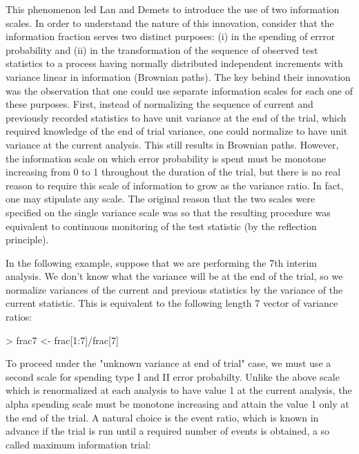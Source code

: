 \documentclass{article}
\begin{document}
\begin{itemize}
{    This phenomenon led Lan and Demets to introduce the use of two information scales.  In order
    to understand the nature of this innovation, consider that the information fraction serves
    two distinct purposes: (i) in the spending of errror probability and (ii) in the
    transformation of the sequence of observed test statistics to a process having normally
    distributed independent increments with variance linear in information (Brownian paths). The
    key behind their innovation was the observation that one could use separate information
    scales for each one of these purposes. First, instead of normalizing the sequence of current
    and previously recorded statistics to have unit variance at the end of the trial, which
    required knowledge of the end of trial variance, one could normalize to have unit variance
    at the current analysis. This still results in Brownian paths.  However, the information
    scale on which error probability is spent must be monotone increasing from 0 to 1 throughout
    the duration of the trial, but there is no real reason to require this scale of information
    to grow as the variance ratio.  In fact, one may stipulate any scale.  The original reason
    that the two scales were specified on the single variance scale was so that the resulting
    procedure was equivalent to continuous monitoring of the test statistic (by the reflection
    principle).  
    
    In the following example, suppose that we are performing the 7th interim analysis. We don't
    know what the variance will be at the end of the trial, so we normalize variances of the
    current and previous statistics by the variance of the current statistic.  This is
    equivalent to the following length 7 vector of variance ratios:
    
\begin{Schunk}
\begin{Sinput}
> frac7 <- frac[1:7]/frac[7]
\end{Sinput}
\end{Schunk}
    To proceed under the "unknown variance at end of trial" case, we must use a second
    scale for spending type I and II error probabilty. Unlike the above scale
    which is renormalized at each analysis to have value 1 at the current analysis, the
    alpha spending scale must be monotone increasing and attain the value 1 only at the
    end of the trial. A natural choice is the event ratio, which is known in advance if
    the trial is run until a required number of events is obtained, a so called
    maximum information trial:

}
\end{itemize}
\end{document}
